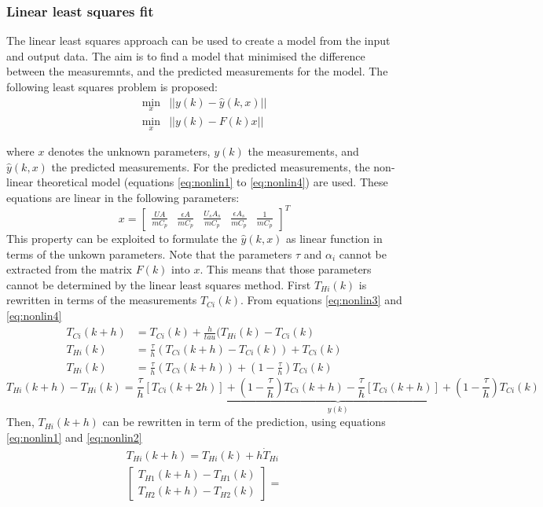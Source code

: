 \subsubsection{Linear least squares fit}
The linear least squares approach can be used to create a model from the input and output data. The aim is to find a model that minimised the difference between the measuremnts, and the predicted measurements for the model. The following least squares problem is proposed:
\begin{align}
    \displaystyle \min_{x} &||y(k)-\hat{y}(k,x)|| \nonumber \\
    \displaystyle \min_{x} &||y(k)-F(k)x||\label{eq:leastsquarescost}
\end{align}


where $x$ denotes the unknown parameters, $y(k)$ the measurements, and $\hat{y}(k,x)$ the predicted measurements. For the predicted measurements, the non-linear theoretical model (equations \ref{eq:nonlin1} to \ref{eq:nonlin4}) are used. These equations are linear in the following parameters:
$$
x = \begin{bmatrix}
\frac{UA}{mC_p} & \frac{\epsilon A}{mC_p} & \frac{U_sA_s}{mC_p} & \frac{\epsilon A_s}{mC_p} & \frac{1}{mC_p}
\end{bmatrix}^T
$$
This property can be exploited to formulate the $\hat{y}(k,x)$ as linear function in terms of the unkown parameters. Note that the parameters $\tau$ and $\alpha_i$ cannot be extracted from the matrix $F(k)$ into $x$. This means that those parameters cannot be determined by the linear least squares method.
First $T_{Hi}(k)$ is rewritten in terms of the measurements $T_{Ci}(k)$. From equations \ref{eq:nonlin3} and \ref{eq:nonlin4}
\begin{align*}
    T_{Ci}(k+h) &= T_{Ci}(k) + \frac{h}{tau}(T_{Hi}(k) - T_{Ci}(k)\\
    T_{Hi}(k) &= \frac{\tau}{h}(T_{Ci}(k+h) - T_{Ci}(k)) + T_{Ci}(k)\\
    T_{Hi}(k) &= \frac{\tau}{h}(T_{Ci}(k+h)) + (1-\frac{\tau}{h})T_{Ci}(k)
\end{align*}
\begin{equation}
    T_{Hi}(k+h) - T_{Hi}(k) = \underbrace{\frac{\tau}{h}[T_{Ci}(k+2h)] + (1-\frac{\tau}{h})T_{Ci}(k+h) - \frac{\tau}{h}[T_{Ci}(k+h)] + (1-\frac{\tau}{h})T_{Ci}(k)}_{y(k)} \label{eq:leastsquares1}
\end{equation}
Then, $T_{Hi}(k+h)$ can be rewritten in term of the prediction, using equations \ref{eq:nonlin1} and \ref{eq:nonlin2}
\begin{align*}
    T_{Hi}(k+h) = T_{Hi}(k) + h\dot{T}_{Hi}\\
    \begin{bmatrix}
        T_{H1}(k+h) - T_{H1}(k) \\
        T_{H2}(k+h) - T_{H2}(k)
    \end{bmatrix} = 
\end{align*}
